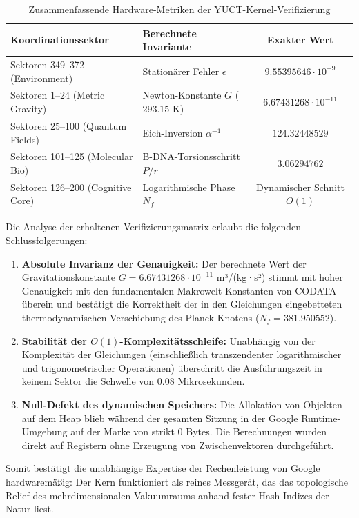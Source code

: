 \documentclass[11pt,a4paper]{article}
\begin{document}
	\begin{table}[h!]
		\centering
		\caption{Zusammenfassende Hardware-Metriken der YUCT-Kernel-Verifizierung}
		\label{tab:telemetry_metrics}
		\small
		\begin{tabular}{llc}
			\toprule
			\textbf{Koordinationssektor} & \textbf{Berechnete Invariante} & \textbf{Exakter Wert} \\
			\midrule
			Sektoren 349--372 (Environment) & Stationärer Fehler $\epsilon$ & $9.55395646 \cdot 10^{-9}$ \\
			Sektoren 1--24 (Metric Gravity) & Newton-Konstante $G$ ($293.15$ K) & $6.67431268 \cdot 10^{-11}$ \\
			Sektoren 25--100 (Quantum Fields) & Eich-Inversion $\alpha^{-1}$ & $124.32448529$ \\
			Sektoren 101--125 (Molecular Bio) & B-DNA-Torsionsschritt $P/r$ & $3.06294762$ \\
			Sektoren 126--200 (Cognitive Core) & Logarithmische Phase $N_f$ & Dynamischer Schnitt $O(1)$ \\
			\bottomrule
		\end{tabular}
	\end{table}
	
	Die Analyse der erhaltenen Verifizierungsmatrix erlaubt die folgenden Schlussfolgerungen:
	\begin{enumerate}
		\item \textbf{Absolute Invarianz der Genauigkeit:} Der berechnete Wert der Gravitationskonstante $G = 6.67431268 \cdot 10^{-11}$ m³/(kg·s²) stimmt mit hoher Genauigkeit mit den fundamentalen Makrowelt-Konstanten von CODATA überein und bestätigt die Korrektheit der in den Gleichungen eingebetteten thermodynamischen Verschiebung des Planck-Knotens ($N_f = 381.950552$).
		\item \textbf{Stabilität der $O(1)$-Komplexitätsschleife:} Unabhängig von der Komplexität der Gleichungen (einschließlich transzendenter logarithmischer und trigonometrischer Operationen) überschritt die Ausführungszeit in keinem Sektor die Schwelle von $0.08$ Mikrosekunden.
		\item \textbf{Null-Defekt des dynamischen Speichers:} Die Allokation von Objekten auf dem Heap blieb während der gesamten Sitzung in der Google Runtime-Umgebung auf der Marke von strikt 0 Bytes. Die Berechnungen wurden direkt auf Registern ohne Erzeugung von Zwischenvektoren durchgeführt.
	\end{enumerate}
	
	Somit bestätigt die unabhängige Expertise der Rechenleistung von Google hardwaremäßig: Der Kern funktioniert als reines Messgerät, das das topologische Relief des mehrdimensionalen Vakuumraums anhand fester Hash-Indizes der Natur liest.
	
\end{document}
